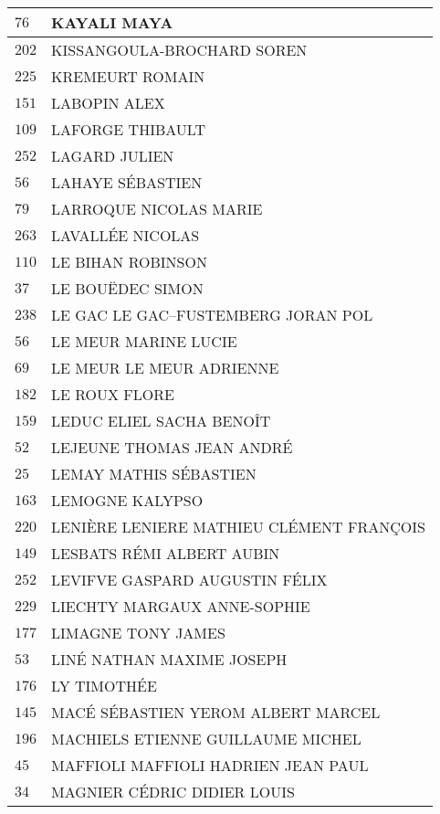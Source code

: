 \begin{xltabular}{\linewidth}{|l|X|}
    \hline
    $76$ & KAYALI MAYA \\
    \hline
    $202$ & KISSANGOULA-BROCHARD SOREN \\
    \hline
    $225$ & KREMEURT ROMAIN \\
    \hline
    $151$ & LABOPIN ALEX \\
    \hline
    $109$ & LAFORGE THIBAULT \\
    \hline
    $252$ & LAGARD JULIEN \\
    \hline
    $56$ & LAHAYE SÉBASTIEN \\
    \hline
    $79$ & LARROQUE NICOLAS MARIE \\
    \hline
    $263$ & LAVALLÉE NICOLAS \\
    \hline
    $110$ & LE BIHAN ROBINSON \\
    \hline
    $37$ & LE BOUËDEC SIMON \\
    \hline
    $238$ & LE GAC LE GAC--FUSTEMBERG JORAN POL \\
    \hline
    $56$ & LE MEUR MARINE LUCIE \\
    \hline
    $69$ & LE MEUR LE MEUR ADRIENNE \\
    \hline
    $182$ & LE ROUX FLORE \\
    \hline
    $159$ & LEDUC ELIEL SACHA BENOÎT \\
    \hline
    $52$ & LEJEUNE THOMAS JEAN ANDRÉ \\
    \hline
    $25$ & LEMAY MATHIS SÉBASTIEN \\
    \hline
    $163$ & LEMOGNE KALYPSO \\
    \hline
    $220$ & LENIÈRE LENIERE MATHIEU CLÉMENT FRANÇOIS \\
    \hline
    $149$ & LESBATS RÉMI ALBERT AUBIN \\
    \hline
    $252$ & LEVIFVE GASPARD AUGUSTIN FÉLIX \\
    \hline
    $229$ & LIECHTY MARGAUX ANNE-SOPHIE \\
    \hline
    $177$ & LIMAGNE TONY JAMES \\
    \hline
    $53$ & LINÉ NATHAN MAXIME JOSEPH \\
    \hline
    $176$ & LY TIMOTHÉE \\
    \hline
    $145$ & MACÉ SÉBASTIEN YEROM ALBERT MARCEL \\
    \hline
    $196$ & MACHIELS ETIENNE GUILLAUME MICHEL \\
    \hline
    $45$ & MAFFIOLI MAFFIOLI HADRIEN JEAN PAUL \\
    \hline
    $34$ & MAGNIER CÉDRIC DIDIER LOUIS \\

\end{xltabular}
